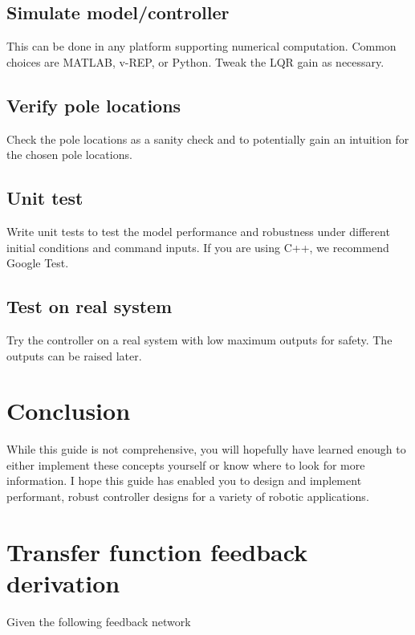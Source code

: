 \documentclass[10pt,conference,compsoc]{IEEEtran}
\begin{document}
\subsection{Simulate model/controller}

\noindent This can be done in any platform supporting numerical computation.
Common choices are MATLAB, v-REP, or Python. Tweak the LQR gain as necessary.

\subsection{Verify pole locations}

\noindent Check the pole locations as a sanity check and to potentially gain an
intuition for the chosen pole locations.

\subsection{Unit test}

\noindent Write unit tests to test the model performance and robustness under
different initial conditions and command inputs. If you are using C++, we
recommend Google Test.

\subsection{Test on real system}

\noindent Try the controller on a real \gls{system} with low maximum outputs for
safety. The outputs can be raised later.

\section{Conclusion}

\noindent While this guide is not comprehensive, you will hopefully have learned
enough to either implement these concepts yourself or know where to look for
more information. I hope this guide has enabled you to design and implement
performant, robust controller designs for a variety of robotic applications.

\appendices

\section{Transfer function feedback derivation}
\label{sec:app_tf_feedback_deriv}

\noindent Given the following feedback network
\end{document}
